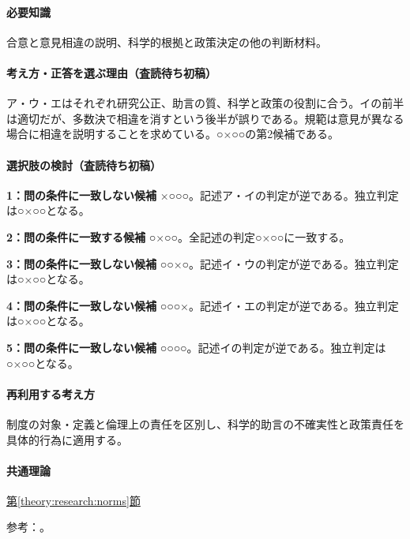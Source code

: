 \paragraph{必要知識} 合意と意見相違の説明、科学的根拠と政策決定の他の判断材料。

\paragraph{考え方・正答を選ぶ理由（査読待ち初稿）} ア・ウ・エはそれぞれ研究公正、助言の質、科学と政策の役割に合う。イの前半は適切だが、多数決で相違を消すという後半が誤りである。規範は意見が異なる場合に相違を説明することを求めている。○×○○の第2候補である。

\paragraph{選択肢の検討（査読待ち初稿）}\mbox{}\par

\noindent\textbf{1：問の条件に一致しない候補} ×○○○。記述ア・イの判定が逆である。独立判定は○×○○となる。\par

\noindent\textbf{2：問の条件に一致する候補} ○×○○。全記述の判定○×○○に一致する。\par

\noindent\textbf{3：問の条件に一致しない候補} ○○×○。記述イ・ウの判定が逆である。独立判定は○×○○となる。\par

\noindent\textbf{4：問の条件に一致しない候補} ○○○×。記述イ・エの判定が逆である。独立判定は○×○○となる。\par

\noindent\textbf{5：問の条件に一致しない候補} ○○○○。記述イの判定が逆である。独立判定は○×○○となる。\par

\paragraph{再利用する考え方} 制度の対象・定義と倫理上の責任を区別し、科学的助言の不確実性と政策責任を具体的行為に適用する。

\paragraph{共通理論} \hyperref[theory:research:norms]{第\ref*{theory:research:norms}節}

\par 参考：\cite{scj_code2013}。

